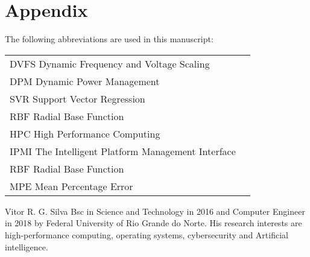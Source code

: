 \documentclass{ieeeaccess}
\begin{document}



%
%

\section*{Appendix}

The following abbreviations are used in this manuscript:\\

\noindent 
\begin{tabular}{@{}ll}
DVFS Dynamic Frequency and Voltage Scaling\\
DPM Dynamic Power Management\\
SVR Support Vector Regression\\
RBF Radial Base Function\\
HPC High Performance Computing\\
IPMI The Intelligent Platform Management Interface\\
RBF Radial Base Function\\
MPE Mean Percentage Error
\end{tabular}


\begin{IEEEbiography}{Vitor R. G. Silva}
Bsc in Science and Technology in 2016 and Computer Engineer in 2018 by Federal University of Rio Grande do Norte. His research interests are high-performance computing, operating systems, cybersecurity and Artificial intelligence.
\end{IEEEbiography}
\end{document}
